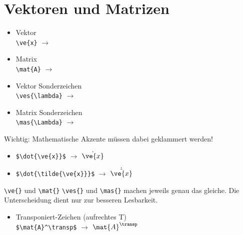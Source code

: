 \section*{Vektoren und Matrizen}
\begin{itemize}
	\item Vektor\\ \verb|| $\rightarrow$ \ve{x}
	\item Matrix\\ \verb|| $\rightarrow$ \mat{A}
	\item Vektor Sonderzeichen\\ \verb|\ves{\lambda}| $\rightarrow$ \ves{\lambda}
	\item Matrix Sonderzeichen\\ \verb|\mas{\Lambda}| $\rightarrow$ \mas{\Lambda}
\end{itemize}
Wichtig: Mathematische Akzente müssen dabei geklammert werden!
\begin{itemize}
	\item \verb|$\dot{\ve{x}}$| $\rightarrow$  $\dot{\ve{x}}$
	\item \verb|$\dot{\tilde{\ve{x}}}$| $\rightarrow$ $\dot{\tilde{\ve{x}}}$
\end{itemize}
\verb|\ve{}| und \verb|\mat{}| \bzw \verb|\ves{}| und \verb|\mas{}| machen jeweils genau das gleiche. Die Unterscheidung dient nur zur besseren Lesbarkeit.

\begin{itemize}
	\item Transponiert-Zeichen (aufrechtes T)\\ \verb|$\mat{A}^\transp$| $\rightarrow$ $\mat{A}^\transp$
\end{itemize}


